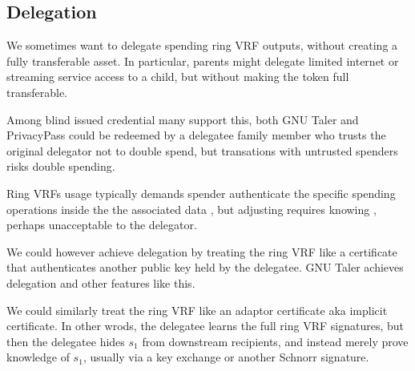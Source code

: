 \subsection{Delegation}

We sometimes want to delegate spending ring VRF outputs, without
creating a fully transferable asset.  In particular, parents might
delegate limited internet or streaming service access to a child,
but without making the token full transferable.

Among blind issued credential many support this, both
GNU Taler \cite{taler} and PrivacyPass \cite{PrivacyPass} could
be redeemed by a delegatee family member who trusts the original
delegator not to double spend, but transations with untrusted spenders
risks double spending.  

Ring VRFs usage typically demands spender authenticate the specific
spending operations inside the the associated data \aux, but adjusting
\aux requires knowing \sk, perhaps unacceptable to the delegator.

We could however achieve delegation by treating the ring VRF like a
certificate that authenticates another public key held by the delegatee.
GNU Taler achieves delegation and other features like this.

We could similarly treat the ring VRF like an adaptor certificate aka
implicit certificate.  In other wrods, the delegatee learns the full
ring VRF signatures, but then the delegatee hides $s_1$ from downstream
recipients, and instead merely prove knowledge of $s_1$, usually via
a key exchange or another Schnorr signature.

